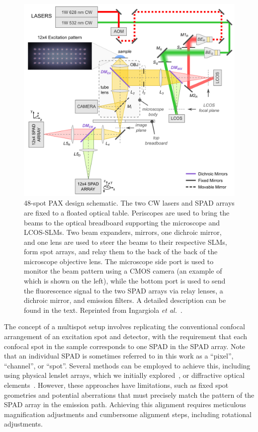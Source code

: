 \begin{figure}
\centering
\includegraphics[width=0.7\linewidth]{chapters/figures/design_multispot_LCOS_camera_SPAD.png}
\caption{\label{fig:setup} 48-spot PAX design schematic. 
The two \ac{CW} lasers and \ac{SPAD} arrays are fixed to a floated optical table. 
Periscopes are used to bring the beams to the optical breadboard supporting the microscope and \ac{LCOS-SLM}s. 
Two beam expanders, mirrors, one dichroic mirror, and one lens are used to steer the beams to their respective SLMs, form spot arrays, and relay them to the back of the back of the microscope objective lens.
The microscope side port is used to monitor the beam pattern using a \ac{CMOS} camera (an example of which is shown on the left), while the bottom port is used to send the fluorescence signal to the two \ac{SPAD} arrays via relay lenses, a dichroic mirror, and emission filters. 
A detailed description can be found in the text.
Reprinted from Ingargiola \textit{et al.}~\cite{ingargiola_JCP_2018}.}
\end{figure}

The concept of a multispot setup involves replicating the conventional confocal arrangement of an excitation spot and detector, with the requirement that each confocal spot in the sample corresponds to one \ac{SPAD} in the \ac{SPAD} array. 
Note that an individual \ac{SPAD} is sometimes referred to in this work as a \enquote{pixel}, \enquote{channel}, or \enquote{spot}.
Several methods can be employed to achieve this, including using physical lenslet arrays, which we initially explored~\cite{colyer_SPIE_2010}, or diffractive optical elements~\cite{gosh_JBO_2005, krmpot_SPIE_2015}. 
However, these approaches have limitations, such as fixed spot geometries and potential aberrations that must precisely match the pattern of the \ac{SPAD} array in the emission path. 
Achieving this alignment requires meticulous magnification adjustments and cumbersome alignment steps, including rotational adjustments.


